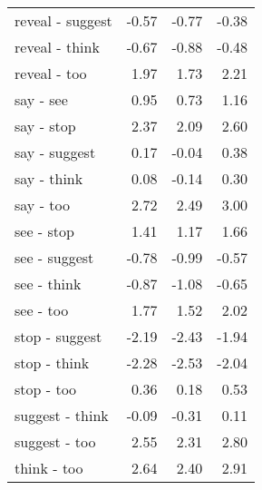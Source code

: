 \begin{longtable}{lrrr}
  reveal - suggest & -0.57 & -0.77 & -0.38 \\ 
  reveal - think & -0.67 & -0.88 & -0.48 \\ 
  reveal - too & 1.97 & 1.73 & 2.21 \\ 
  say - see & 0.95 & 0.73 & 1.16 \\ 
  say - stop & 2.37 & 2.09 & 2.60 \\ 
  say - suggest & 0.17 & -0.04 & 0.38 \\ 
  say - think & 0.08 & -0.14 & 0.30 \\ 
  say - too & 2.72 & 2.49 & 3.00 \\ 
  see - stop & 1.41 & 1.17 & 1.66 \\ 
  see - suggest & -0.78 & -0.99 & -0.57 \\ 
  see - think & -0.87 & -1.08 & -0.65 \\ 
  see - too & 1.77 & 1.52 & 2.02 \\ 
  stop - suggest & -2.19 & -2.43 & -1.94 \\ 
  stop - think & -2.28 & -2.53 & -2.04 \\ 
  stop - too & 0.36 & 0.18 & 0.53 \\ 
  suggest - think & -0.09 & -0.31 & 0.11 \\ 
  suggest - too & 2.55 & 2.31 & 2.80 \\ 
  think - too & 2.64 & 2.40 & 2.91 \\ 
  \end{longtable}

